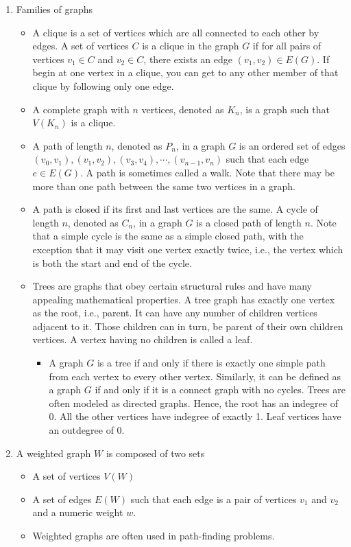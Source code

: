 \documentclass[14pt]{article}
\begin{document}
\begin{enumerate}
 \item Families of graphs
 \begin{itemize}
  \item A clique is a set of vertices which are all connected to each other by edges. A set of vertices $C$ is a clique in the graph $G$ if for all pairs of vertices $v_1 \in C$ and $v_2 \in C$, there exists an edge $(v_1, v_2) \in E(G)$. If begin at one vertex in a clique, you can get to any other member of that clique by following only one edge.
  \item A complete graph with $n$ vertices, denoted as $K_n$, is a graph such that $V(K_n) $ is a clique.
  \item A path of length $n$, denoted as $P_n$, in a graph $G$ is an ordered set of edges ${(v_0,v_1),(v_1,v_2),(v_3,v_4), \cdots, (v_{n-1},v_n)}$ such that each edge $e \in E(G)$. A path is sometimes called a walk. Note that there may be more than one path between the same two vertices in a graph. 
  \item A path is closed if its first and last vertices are the same. A cycle of length $n$, denoted as $C_n$, in a graph $G$ is a closed path of length $n$. Note that a simple cycle is the same as a simple closed path, with the exception that it may visit one vertex exactly twice, i.e., the vertex which is both the start and end of the cycle.
  \item Trees are graphs that obey certain structural rules and have many appealing mathematical properties. A tree graph has exactly one vertex as the root, i.e., parent. It can have any number of children vertices adjacent to it. Those children can in turn, be parent of their own children vertices. A vertex having no children is called a leaf. 
   \begin{itemize}
    \item A graph $G$ is a tree if and only if there is exactly one simple path from each vertex to every other vertex. Similarly, it can be defined as a graph $G$ if and only if it is a connect graph with no cycles. Trees are often modeled as directed graphs. Hence, the root has an indegree of 0. All the other vertices have indegree of exactly 1. Leaf vertices have an outdegree of 0.
   \end{itemize}
 \end{itemize}
 
 \item A weighted graph $W$ is composed of two sets
  \begin{itemize}
   \item A set of vertices $V(W)$ 
   \item A set of edges $E(W)$ such that each edge is a pair of vertices $v_1$ and $v_2$ and a numeric weight $w$.
   \item Weighted graphs are often used in path-finding problems. 
  \end{itemize}
  

\end{enumerate}
\end{document}
